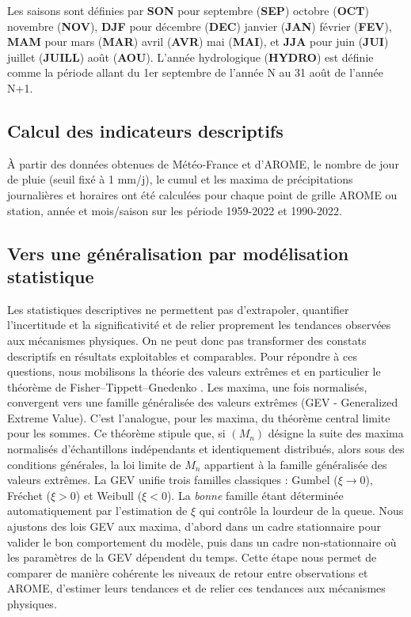 \documentclass[
  article,
  nofooter,
  noheadings]{jss}
\begin{document}
Les saisons sont définies par \textbf{SON} pour septembre (\textbf{SEP})
octobre (\textbf{OCT}) novembre (\textbf{NOV}), \textbf{DJF} pour
décembre (\textbf{DEC}) janvier (\textbf{JAN}) février (\textbf{FEV}),
\textbf{MAM} pour mars (\textbf{MAR}) avril (\textbf{AVR}) mai
(\textbf{MAI}), et \textbf{JJA} pour juin (\textbf{JUI}) juillet
(\textbf{JUILL}) août (\textbf{AOU}). L'année hydrologique
(\textbf{HYDRO}) est définie comme la période allant du 1er septembre de
l'année N au 31 août de l'année N+1.

\subsection{Calcul des indicateurs
descriptifs}\label{calcul-des-indicateurs-descriptifs}

À partir des données obtenues de Météo-France et d'AROME, le nombre de
jour de pluie (seuil fixé à 1 mm/j), le cumul et les maxima de
précipitations journalières et horaires ont été calculées pour chaque
point de grille AROME ou station, année et mois/saison sur les période
1959-2022 et 1990-2022.

\subsection{Vers une généralisation par modélisation
statistique}\label{vers-une-guxe9nuxe9ralisation-par-moduxe9lisation-statistique}

Les statistiques descriptives ne permettent pas d'extrapoler, quantifier
l'incertitude et la significativité et de relier proprement les
tendances observées aux mécanismes physiques. On ne peut donc pas
transformer des constats descriptifs en résultats exploitables et
comparables. Pour répondre à ces questions, nous mobilisons la théorie
des valeurs extrêmes et en particulier le théorème de
Fisher--Tippett--Gnedenko \citep{coles2001introduction}. Les maxima, une
fois normalisés, convergent vers une famille généralisée des valeurs
extrêmes (GEV - Generalized Extreme Value). C'est l'analogue, pour les
maxima, du théorème central limite pour les sommes. Ce théorème stipule
que, si \((M_n)\) désigne la suite des maxima normalisés d'échantillons
indépendants et identiquement distribués, alors sous des conditions
générales, la loi limite de \(M_n\) appartient à la famille généralisée
des valeurs extrêmes. La GEV unifie trois familles classiques : Gumbel
(\(\xi \to 0\)), Fréchet (\(\xi > 0\)) et Weibull (\(\xi < 0\)). La
\emph{bonne} famille étant déterminée automatiquement par l'estimation
de \(\xi\) qui contrôle la lourdeur de la queue. Nous ajustons des lois
GEV aux maxima, d'abord dans un cadre stationnaire pour valider le bon
comportement du modèle, puis dans un cadre non‑stationnaire où les
paramètres de la GEV dépendent du temps. Cette étape nous permet de
comparer de manière cohérente les niveaux de retour entre observations
et AROME, d'estimer leurs tendances et de relier ces tendances aux
mécanismes physiques.
\end{document}
